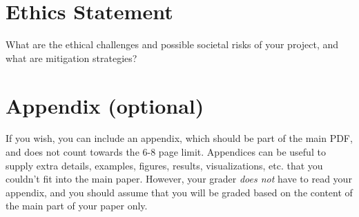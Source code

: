 \documentclass{article}
\begin{document}
\section{Ethics Statement}
What are the ethical challenges and possible societal risks of your project, and
what are mitigation strategies?




\appendix

\section{Appendix (optional)}
If you wish, you can include an appendix, which should be part of the main PDF, and does not count towards the 6-8 page limit.
Appendices can be useful to supply extra details, examples, figures, results, visualizations, etc. that you couldn't fit into the main paper. However, your grader \textit{does not} have to read your appendix, and you should assume that you will be graded based on the content of the main part of your paper only.
\end{document}
